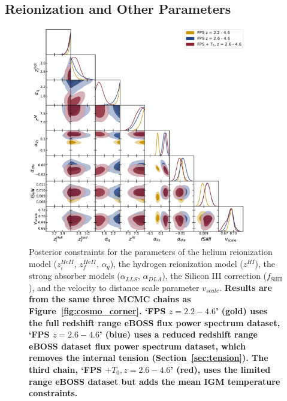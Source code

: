 
\subsection{Reionization and Other Parameters}\label{sec:astro}

\begin{figure}
    \centering
    \includegraphics[width=0.85\textwidth]{figures/astro_corner.pdf}
    \caption{\label{fig:astro_corner}
    Posterior constraints for the parameters of the helium reionization model ($z_i^{HeII}$, $z_f^{HeII}$, $\alpha_q$), the hydrogen reionization model ($z^{HI}$), the strong absorber models ($\alpha_{LLS}$, $\alpha_{DLA}$), the Silicon III correction ($f_\mathrm{SiIII}$), and the velocity to distance scale parameter $v_{scale}$.
    \textbf{Results are from the same three MCMC chains as Figure~\ref{fig:cosmo_corner}. `FPS $z=2.2-4.6$' (gold) uses the full redshift range eBOSS flux power spectrum dataset, `FPS $z=2.6-4.6$' (blue) uses a reduced redshift range eBOSS dataset flux power spectrum dataset, which removes the internal tension (Section~\ref{sec:tension}). The third chain, `FPS $+ T_0, z=2.6-4.6$' (red), uses the limited range eBOSS dataset but adds the mean IGM temperature constraints.}
    }
\end{figure}

